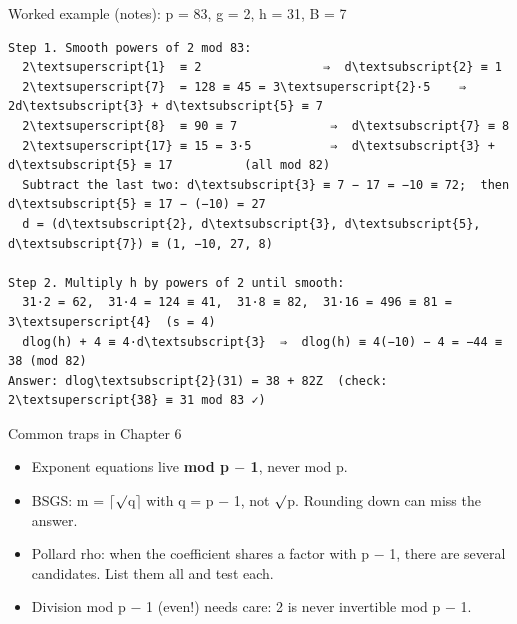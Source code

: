 \documentclass[11pt,a4paper]{article}
\begin{document}
\begin{example}{Worked example (notes): p = 83, g = 2, h = 31, B = 7}
\begin{workbox}
\begin{Verbatim}[commandchars=\\\{\},fontsize=\footnotesize]
Step 1. Smooth powers of 2 mod 83:
  2\textsuperscript{1}  ≡ 2                 ⇒  d\textsubscript{2} ≡ 1
  2\textsuperscript{7}  = 128 ≡ 45 = 3\textsuperscript{2}·5    ⇒  2d\textsubscript{3} + d\textsubscript{5} ≡ 7
  2\textsuperscript{8}  ≡ 90 ≡ 7             ⇒  d\textsubscript{7} ≡ 8
  2\textsuperscript{17} ≡ 15 = 3·5           ⇒  d\textsubscript{3} + d\textsubscript{5} ≡ 17          (all mod 82)
  Subtract the last two: d\textsubscript{3} ≡ 7 − 17 = −10 ≡ 72;  then d\textsubscript{5} ≡ 17 − (−10) = 27
  d = (d\textsubscript{2}, d\textsubscript{3}, d\textsubscript{5}, d\textsubscript{7}) ≡ (1, −10, 27, 8)

Step 2. Multiply h by powers of 2 until smooth:
  31·2 = 62,  31·4 = 124 ≡ 41,  31·8 ≡ 82,  31·16 = 496 ≡ 81 = 3\textsuperscript{4}  (s = 4)
  dlog(h) + 4 ≡ 4·d\textsubscript{3}  ⇒  dlog(h) ≡ 4(−10) − 4 = −44 ≡ 38 (mod 82)
Answer: dlog\textsubscript{2}(31) = 38 + 82Z  (check: 2\textsuperscript{38} ≡ 31 mod 83 ✓)
\end{Verbatim}
\end{workbox}
\end{example}
\begin{trap}{Common traps in Chapter 6}
\begin{itemize}
\item Exponent equations live \textbf{mod p \ensuremath{-} 1}, never mod p.
\item BSGS: m = \ensuremath{\lceil}\ensuremath{\surd}q\ensuremath{\rceil} with q = p \ensuremath{-} 1, not \ensuremath{\surd}p. Rounding down can miss the answer.
\item Pollard rho: when the coefficient shares a factor with p \ensuremath{-} 1, there are several candidates. List them all and test each.
\item Division mod p \ensuremath{-} 1 (even!) needs care: 2 is never invertible mod p \ensuremath{-} 1.
\end{itemize}
\end{trap}
\end{document}
